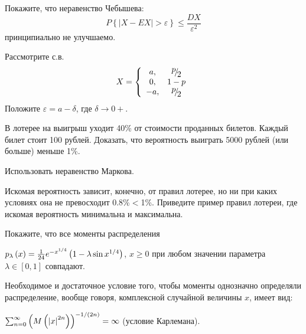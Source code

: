 \begin{problem}
Покажите, что неравенство Чебышева:
\[P\left\{\left|X-EX\right|>\varepsilon \right\}\le \frac{DX}{\varepsilon ^{2} } \] 
принципиально не улучшаемо.

\begin{ordre} 
Рассмотрите с.в. 
\[X=\left\{\begin{array}{cc} {a,} & {{\raise0.7ex\hbox{$ p $}\!\mathord{\left/ {\vphantom {p 2}} \right. \kern-\nulldelimiterspace}\!\lower0.7ex\hbox{$ 2 $}} } \\ {0,} & {1-p} \\ {-a,} & {{\raise0.7ex\hbox{$ p $}\!\mathord{\left/ {\vphantom {p 2}} \right. \kern-\nulldelimiterspace}\!\lower0.7ex\hbox{$ 2 $}} } \end{array}\right. \] 
Положите $\varepsilon =a-\delta $, где $\delta \to 0+$.
\end{ordre}

\end{problem}

\begin{problem}

 В лотерее на выигрыш уходит 40\% от стоимости проданных билетов. Каждый билет стоит 100 рублей. Доказать, что вероятность выиграть 5000 рублей (или больше) меньше 1\%.

\begin{ordre} 
Использовать неравенство Маркова.
\end{ordre}

Искомая вероятность зависит, конечно, от правил лотерее, но ни при каких условиях она не превосходит 0.8\%$<$1\%.
Приведите пример правил лотереи, где искомая вероятность минимальна и максимальна.

\end{problem}

\begin{problem}

Покажите, что все моменты распределения

 $p_{\lambda } \left(x\right)=\frac{1}{24} e^{-x^{{1\mathord{\left/ {\vphantom {1 4}} \right. \kern-\nulldelimiterspace} 4} } } \left(1-\lambda \sin x^{{1\mathord{\left/ {\vphantom {1 4}} \right. \kern-\nulldelimiterspace} 4} } \right)$, $x\ge 0$ при любом значении параметра $\lambda \in \left[0,1\right]$ совпадают.

\begin{remark}

Необходимое и достаточное условие того, чтобы моменты однозначно определяли распределение, вообще говоря, комплексной случайной величины $x$, имеет вид:

\noindent $\sum _{n=0}^{\infty }\left(M\left(\left|x\right|^{2n} \right)\right)^{{-1\mathord{\left/ {\vphantom {-1 \left(2n\right)}} \right. \kern-\nulldelimiterspace} \left(2n\right)} } =\infty  $ (условие Карлемана).
\end{remark}

\end{problem} 

